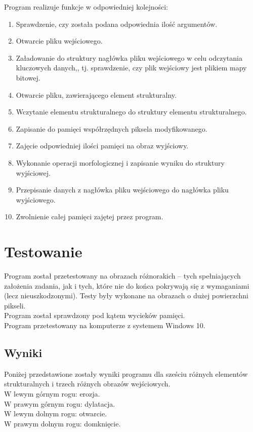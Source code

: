 \documentclass[12pt,a4paper,twoside]{article}
\begin{document}
Program realizuje funkcje w odpowiedniej kolejności:
\begin{enumerate}
\item Sprawdzenie, czy została podana odpowiednia ilość argumentów.
\item Otwarcie pliku wejściowego.
\item Załadowanie do struktury nagłówka pliku wejściowego w celu odczytania kluczowych danych,, tj. sprawdzenie, czy plik wejściowy jest plikiem mapy bitowej.
\item Otwarcie pliku, zawierającego element strukturalny.
\item Wczytanie elementu strukturalnego do struktury elementu strukturalnego.
\item Zapisanie do pamięci współrzędnych piksela modyfikowanego.
\item Zajęcie odpowiedniej ilości pamięci na obraz wyjściowy.
\item Wykonanie operacji morfologicznej i zapisanie wyniku do struktury wyjściowej.
\item Przepisanie danych z nagłówka pliku wejściowego do nagłówka pliku wyjściowego.
\item Zwolnienie całej pamięci zajętej przez program.
\end{enumerate}

\section{Testowanie}
Program został przetestowany na obrazach różnorakich – tych spełniających założenia zadania, jak i tych, które nie do końca pokrywają się z wymaganiami (lecz nieuszkodzonymi). Testy były wykonane na obrazach o dużej powierzchni pikseli. \\

Program został sprawdzony pod kątem wycieków pamięci. \\

Program przetestowany na komputerze z systemem Windows 10.

\clearpage

\subsection{Wyniki}
Poniżej przedstawione zostały wyniki programu dla sześciu różnych elementów strukturalnych i trzech różnych obrazów wejściowych. \\
W lewym górnym rogu: erozja. \\
W prawym górnym rogu: dylatacja. \\
W lewym dolnym rogu: otwarcie. \\
W prawym dolnym rogu: domknięcie. \\
\end{document}
